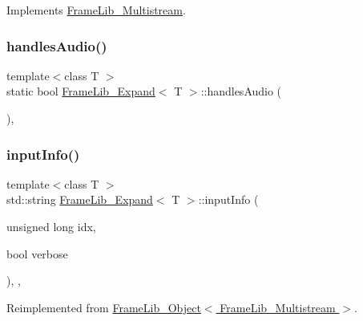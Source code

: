 Implements \hyperlink{class_frame_lib___multistream_a881e38e7846d7cc68c49b86b7c839072}{Frame\+Lib\+\_\+\+Multistream}.

\mbox{\label{class_frame_lib___expand_a77c0e4af675ebb2ac3f47b26939ab94b}} 
\subsubsection{\texorpdfstring{handles\+Audio()}{handlesAudio()}}
{\footnotesize\ttfamily template$<$class T $>$ \\
static bool \hyperlink{class_frame_lib___expand}{Frame\+Lib\+\_\+\+Expand}$<$ T $>$\+::handles\+Audio (\begin{DoxyParamCaption}{ }\end{DoxyParamCaption})\hspace{0.3cm}{\ttfamily [inline]}, {\ttfamily [static]}}

\mbox{\label{class_frame_lib___expand_a0e29df27f7dac1cd8082a468a24fe07e}} 
\subsubsection{\texorpdfstring{input\+Info()}{inputInfo()}}
{\footnotesize\ttfamily template$<$class T $>$ \\
std\+::string \hyperlink{class_frame_lib___expand}{Frame\+Lib\+\_\+\+Expand}$<$ T $>$\+::input\+Info (\begin{DoxyParamCaption}\item[{unsigned long}]{idx,  }\item[{bool}]{verbose }\end{DoxyParamCaption})\hspace{0.3cm}{\ttfamily [inline]}, {\ttfamily [override]}, {\ttfamily [virtual]}}



Reimplemented from \hyperlink{class_frame_lib___object_a49abea5f18125c425b1eae8710735891}{Frame\+Lib\+\_\+\+Object$<$ Frame\+Lib\+\_\+\+Multistream $>$}.

\mbox{\label{class_frame_lib___expand_ad5300f03d5fe2531a97ecb4e28a044bf}} 
